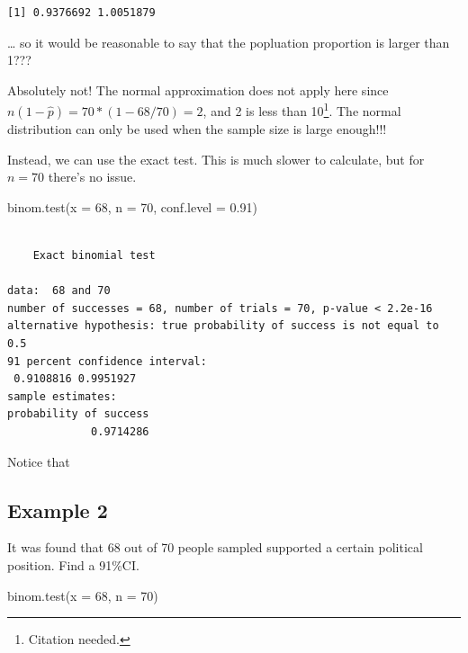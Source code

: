 \documentclass[
  letterpaper,
  DIV=11,
  numbers=noendperiod,
  oneside]{scrreprt}
\newenvironment{Shaded}{\begin{snugshade}}{\end{snugshade}}
\newcommand{\AttributeTok}[1]{\textcolor[rgb]{0.40,0.45,0.13}{#1}}
\newcommand{\DecValTok}[1]{\textcolor[rgb]{0.68,0.00,0.00}{#1}}
\newcommand{\FloatTok}[1]{\textcolor[rgb]{0.68,0.00,0.00}{#1}}
\newcommand{\FunctionTok}[1]{\textcolor[rgb]{0.28,0.35,0.67}{#1}}
\newcommand{\NormalTok}[1]{\textcolor[rgb]{0.00,0.23,0.31}{#1}}
\begin{document}
\begin{verbatim}
[1] 0.9376692 1.0051879
\end{verbatim}

\ldots{} so it would be reasonable to say that the popluation proportion
is larger than 1???

Absolutely not! The normal approximation does not apply here since
\(n(1 - \hat p) = 70*(1 - 68/70) = 2\), and 2 is less than
10\footnote{Citation needed.}. The normal distribution can only be used
when the sample size is large enough!!!

Instead, we can use the exact test. This is much slower to calculate,
but for \(n = 70\) there's no issue.

\begin{Shaded}
\begin{Highlighting}[]
\FunctionTok{binom.test}\NormalTok{(}\AttributeTok{x =} \DecValTok{68}\NormalTok{, }\AttributeTok{n =} \DecValTok{70}\NormalTok{, }\AttributeTok{conf.level =} \FloatTok{0.91}\NormalTok{)}
\end{Highlighting}
\end{Shaded}

\begin{verbatim}

    Exact binomial test

data:  68 and 70
number of successes = 68, number of trials = 70, p-value < 2.2e-16
alternative hypothesis: true probability of success is not equal to 0.5
91 percent confidence interval:
 0.9108816 0.9951927
sample estimates:
probability of success 
             0.9714286 
\end{verbatim}

Notice that

\hypertarget{example-2-2}{%
\subsection{Example 2}\label{example-2-2}}

It was found that 68 out of 70 people sampled supported a certain
political position. Find a 91\%CI.\pause

\begin{Shaded}
\begin{Highlighting}[]
\FunctionTok{binom.test}\NormalTok{(}\AttributeTok{x =} \DecValTok{68}\NormalTok{, }\AttributeTok{n =} \DecValTok{70}\NormalTok{)}
\end{Highlighting}
\end{Shaded}
\end{document}
